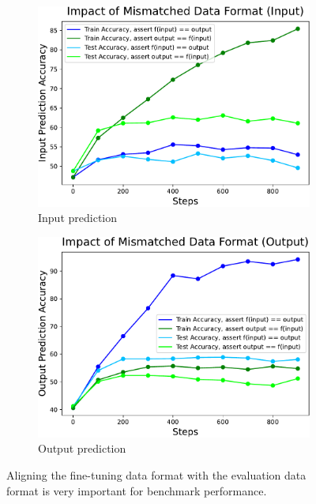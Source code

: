 \begin{figure}[H]
     \centering
     \begin{subfigure}[b]{0.48\textwidth}
         \centering
         \includegraphics[scale=0.4]{figs/finetuning/finetuning_input_format.pdf}
         \caption{Input prediction}
         \label{fig:finetuning-accuracy-format-plot-input}
     \end{subfigure}
     \hfill
     \begin{subfigure}[b]{0.48\textwidth}
         \centering
         \includegraphics[scale=0.4]{figs/finetuning/finetuning_output_format.pdf}
         \caption{Output prediction}
         \label{fig:finetuning-accuracy-format-plot-output}
     \end{subfigure}
     \caption{Aligning the fine-tuning data format with the evaluation data format is very important for benchmark performance.}
     \label{fig:finetuning-accuracy-format-plot}
\end{figure}

